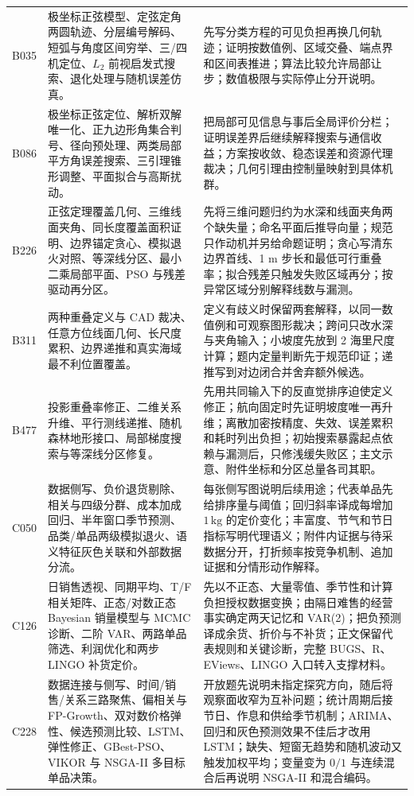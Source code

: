 \documentclass[UTF8,a4paper,12pt]{ctexart}
\begin{document}
\begin{longtable}{p{1.4cm}p{5.2cm}p{7.0cm}}
B035 & 极坐标正弦模型、定弦定角两圆轨迹、分层编号解码、短弧与角度区间穷举、三/四机定位、$L_2$ 前视启发式搜索、退化处理与随机误差仿真。 &
先写分类方程的可见负担再换几何轨迹；证明按数值例、区域交叠、端点界和区间表推进；算法比较允许局部让步；数值极限与实际停止分开说明。\\
B086 & 极坐标正弦定位、解析双解唯一化、正九边形角集合判号、径向预处理、两类局部平方角误差搜索、三引理锥形调整、平面拟合与高斯扰动。 &
把局部可见信息与事后全局评价分栏；证明误差界后继续解释搜索与通信收益；方案按收敛、稳态误差和资源代理裁决；几何引理由控制量映射到具体机群。\\
B226 & 正弦定理覆盖几何、三维线面夹角、同长度覆盖面积证明、边界锚定贪心、模拟退火对照、等深线分区、最小二乘局部平面、PSO 与残差驱动再分区。 &
先将三维问题归约为水深和线面夹角两个缺失量；命名平面后推导向量；规范只作动机并另给命题证明；贪心写清东边界首线、1 m 步长和最低可行重叠率；拟合残差只触发失败区域再分；按异常区域分别解释线数与漏测。\\
B311 & 两种重叠定义与 CAD 裁决、任意方位线面几何、长尺度累积、边界递推和真实海域最不利位置覆盖。 &
定义有歧义时保留两套解释，以同一数值例和可观察图形裁决；跨问只改水深与夹角输入；小坡度先放到 2 海里尺度计算；题内定量判断先于规范印证；递推写到对边闭合并舍弃额外候选。\\
B477 & 投影重叠率修正、二维关系升维、平行测线递推、随机森林地形接口、局部梯度搜索与等深线分区修复。 &
先用共同输入下的反直觉排序迫使定义修正；航向固定时先证明坡度唯一再升维；离散加密按精度、失效、误差累积和耗时列出负担；初始搜索暴露起点依赖与漏测后，只修浅缓失败区；主文示意、附件坐标和分区总量各司其职。\\
C050 & 数据侧写、负价退货剔除、相关与四级分群、成本加成回归、半年窗口季节预测、品类/单品两级模拟退火、语义特征灰色关联和外部数据分流。 &
每张侧写图说明后续用途；代表单品先给排序量与阈值；回归斜率译成每增加 $1\,\mathrm{kg}$ 的定价变化；丰富度、节气和节日指标写明代理语义；附件内证据与待采数据分开，打折频率按竞争机制、追加证据和分情形动作解释。\\
C126 & 日销售透视、同期平均、T/F 相关矩阵、正态/对数正态 Bayesian 销量模型与 MCMC 诊断、二阶 VAR、两路单品筛选、利润优化和两步 LINGO 补货定价。 &
先以不正态、大量零值、季节性和计算负担授权数据变换；由隔日难售的经营事实确定两天记忆和 VAR(2)；把负预测译成余货、折价与不补货；正文保留代表规则和关键诊断，完整 BUGS、R、EViews、LINGO 入口转入支撑材料。\\
C228 & 数据连接与侧写、时间/销售/关系三路聚焦、偏相关与 FP-Growth、双对数价格弹性、候选预测比较、LSTM、弹性修正、GBest-PSO、VIKOR 与 NSGA-II 多目标单品决策。 &
开放题先说明未指定探究方向，随后将观察面收窄为互补问题；统计周期后接节日、作息和供给季节机制；ARIMA、回归和灰色预测效果不佳后才改用 LSTM；缺失、短窗无趋势和随机波动又触发加权平均；变量变为 $0/1$ 与连续混合后再说明 NSGA-II 和混合编码。\\

\end{longtable}
\end{document}
